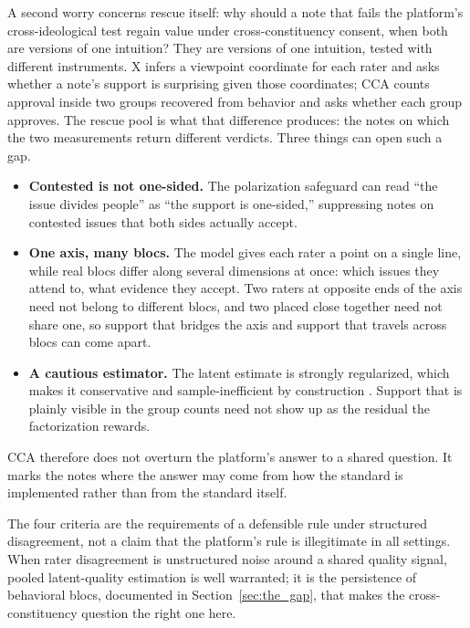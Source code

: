 \documentclass[10pt,twocolumn]{article}
\begin{document}
A second worry concerns rescue itself: why should a note that fails the platform's
cross-ideological test regain value under cross-constituency consent, when both are
versions of one intuition? They are versions of one intuition, tested with
different instruments. X infers a viewpoint coordinate for each rater and asks
whether a note's support is surprising given those coordinates; CCA counts approval
inside two groups recovered from behavior and asks whether each group approves. The
rescue pool is what that difference produces: the notes on which the two
measurements return different verdicts. Three things can open such a gap.

\begin{itemize}[leftmargin=*,itemsep=2pt,topsep=3pt]
    \item \textbf{Contested is not one-sided.} The polarization safeguard can read
    ``the issue divides people'' as ``the support is one-sided,'' suppressing notes
    on contested issues that both sides actually accept.
    \item \textbf{One axis, many blocs.} The model gives each rater a point on a
    single line, while real blocs differ along several dimensions at once: which
    issues they attend to, what evidence they accept. Two raters at opposite ends
    of the axis need not belong to different blocs, and two placed close together
    need not share one, so support that bridges the axis and support that travels
    across blocs can come apart.
    \item \textbf{A cautious estimator.} The latent estimate is strongly
    regularized, which makes it conservative and sample-inefficient by construction
    \citep{goyal2026qsmf}. Support that is plainly visible in the group counts need
    not show up as the residual the factorization rewards.
\end{itemize}

CCA therefore does not overturn the platform's answer to a shared question. It
marks the notes where the answer may come from how the standard is implemented
rather than from the standard itself.

The four criteria are the requirements of a defensible rule under structured
disagreement, not a claim that the platform's rule is illegitimate in all
settings. When rater disagreement is unstructured noise around a shared quality
signal, pooled latent-quality estimation is well warranted; it is the persistence
of behavioral blocs, documented in Section~\ref{sec:the_gap}, that makes the
cross-constituency question the right one here.
\end{document}
